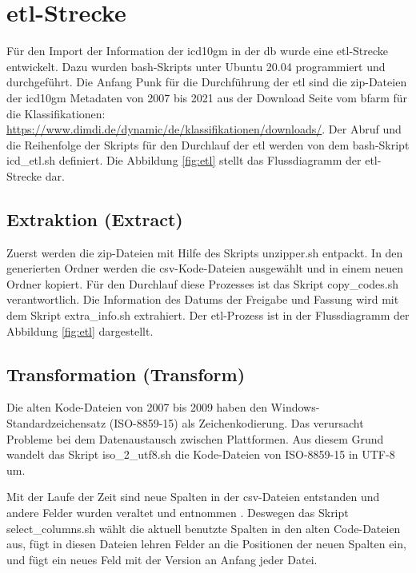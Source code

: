 \section{\acs{etl}-Strecke} \label{etlpipeline}

Für den Import der Information der \ac{icd10gm} in der \ac{db} wurde eine \ac{etl}-Strecke entwickelt. Dazu wurden \ac{bash}-Skripts unter Ubuntu 20.04 programmiert und durchgeführt. Die Anfang Punk für die Durchführung der \ac{etl} sind die \ac{zip}-Dateien der \ac{icd10gm} Metadaten von 2007 bis 2021 aus der Download Seite vom \ac{bfarm} für die Klassifikationen: \url{https://www.dimdi.de/dynamic/de/klassifikationen/downloads/}. Der Abruf und die Reihenfolge der Skripts für den Durchlauf der \ac{etl} werden von dem \ac{bash}-Skript \textsf{icd\_etl.sh} definiert. Die Abbildung \ref{fig:etl} stellt das Flussdiagramm der \ac{etl}-Strecke dar.

\subsection{Extraktion (Extract)}

Zuerst werden die \ac{zip}-Dateien mit Hilfe des Skripts \textsf{unzipper.sh} entpackt. In den generierten Ordner werden die \ac{csv}-Kode-Dateien ausgewählt und in einem neuen Ordner kopiert. Für den Durchlauf diese Prozesses ist das Skript \textsf{copy\_codes.sh} verantwortlich. Die Information des Datums der Freigabe und Fassung wird mit dem Skript \textsf{extra\_info.sh} extrahiert. Der \ac{etl}-Prozess ist in der Flussdiagramm der Abbildung \ref{fig:etl} dargestellt.

\subsection{Transformation (Transform)}

Die alten Kode-Dateien von 2007 bis 2009 haben den Windows-Standardzeichensatz (ISO-8859-15) als Zeichenkodierung. Das verursacht Probleme bei dem Datenaustausch zwischen Plattformen. Aus diesem Grund wandelt das Skript \textsf{iso\_2\_utf8.sh} die Kode-Dateien von ISO-8859-15 in UTF-8 um.

Mit der Laufe der Zeit sind neue Spalten in der \ac{csv}-Dateien entstanden und andere Felder wurden veraltet und entnommen \cite{readme13, readme17}. Deswegen das Skript \textsf{select\_columns.sh} wählt die aktuell benutzte Spalten in den alten Code-Dateien aus, fügt in diesen Dateien lehren Felder an die Positionen der neuen Spalten ein, und fügt ein neues Feld mit der Version an Anfang jeder Datei.

